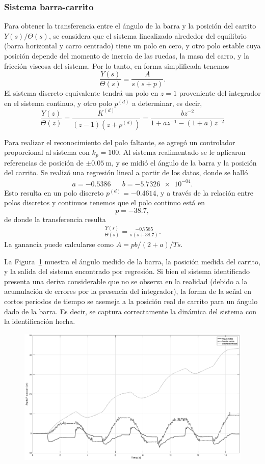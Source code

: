 \subsubsection{Sistema barra-carrito}

Para obtener la transferencia entre el ángulo de la barra y la posición del carrito $Y(s) / \Theta(s)$, se considera que el sistema linealizado alrededor del equilibrio (barra horizontal y carro centrado) tiene un polo en cero, y otro polo estable cuya posición depende del momento de inercia de las ruedas, la masa del carro, y la fricción viscosa del sistema. Por lo tanto, en forma simplificada tenemos
\[
    \frac{Y(s)}{\Theta(s)} = \frac{A}{s(s+p)}.
\]
El sistema discreto equivalente tendrá un polo en $z = 1$ proveniente del integrador en el sistema continuo, y otro polo $p^{(d)}$ a determinar, es decir,
\[
    \frac{Y(z)}{\Theta(z)} = \frac{K^{(d)}}{(z-1)(z+p^{(d)})} = \frac{b z^{-2}}{1 + a z^{-1} - (1+a) z^{-2}}
\]

Para realizar el reconocimiento del polo faltante, se agregó un controlador proporcional al sistema con $k_p = 100$. Al sistema realimentado se le aplicaron referencias de posición de $\pm \qty{0.05}{\m}$, y se midió el ángulo de la barra y la posición del carrito. Se realizó una regresión lineal a partir de los datos, donde se halló
\begin{align*}
    a = -0.5386 && b = \num{-5.7326e-04}.
\end{align*}
Esto resulta en un polo discreto $p^{(d)} = -0.4614$, y a través de la relación entre polos discretos y continuos tenemos que el polo continuo está en
\[
    p = -38.7,
\]
de donde la transferencia resulta
\begin{align*}
    \frac{Y(s)}{\Theta(s)} = \frac{-0.7585}{s(s+38.7)}.
\end{align*}
La ganancia puede calcularse como $A = p b/(2+a)/Ts$.

La Figura~\ref{fig:ident-carro} muestra el ángulo medido de la barra, la posición medida del carrito, y la salida del sistema encontrado por regresión. Si bien el sistema identificado presenta una deriva considerable que no se observa en la realidad (debido a la acumulación de errores por la presencia del integrador), la forma de la señal en cortos períodos de tiempo se asemeja a la posición real de carrito para un ángulo dado de la barra. Es decir, se captura correctamente la dinámica del sistema con la identificación hecha.

\begin{figure}[!htbp]
    \centering
    \includegraphics[width=\linewidth]{img/ident-carrito.eps}
    \caption{}
    \label{fig:ident-carro}
\end{figure}


